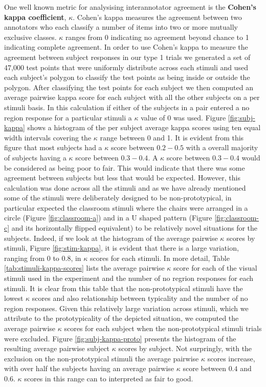\documentclass[11pt,letterpaper]{article}
\begin{document}
One well known metric for analysising interannotator agreement is the \textbf{Cohen's kappa coefficient}, $\kappa$. Cohen's kappa measures the agreement between two annotators who each classify a number of items into two or more mutually exclusive classes. $\kappa$ ranges from 0 indicating no agreement beyond chance to 1 indicating complete agreement. In order to use Cohen's kappa to measure the agreement between subject responses in our type 1 trials we generated a set of 47,000 test points that were uniformly distribute across each stimuli and used each subject's polygon to classify the test points as being inside or outside the polygon. After classifying the test points for each subject we then computed an average pairwise kappa score for each subject with all the other subjects on a per stimuli basis. In this calculation if either of the subjects in a pair entered a no region response for a particular stimuli a $\kappa$ value of 0 was used. Figure \ref{fig:subj-kappa} shows a histogram of the per subject average kappa scores using ten equal width intervals covering the $\kappa$ range between 0 and 1.  It is evident from this figure that most subjects had a $\kappa$ score between $0.2-0.5$ with a overall majority of subjects having a $\kappa$ score between $0.3-0.4$. A $\kappa$ score between $0.3-0.4$ would be considered as being poor to fair. This would indicate that there was some agreement between subjects but less that would be expected. However, this calculation was done across all the stimuli and as we have already mentioned some of the stimuli were deliberately designed to be non-prototypical, in particular expected the classroom stimuli where the chairs were arranged in a circle (Figure \ref{fig:classroom-a}) and in a U shaped pattern (Figure \ref{fig:classroom-c} and its horizontally flipped equivalent) to be relatively novel situations for the subjects. Indeed, if we look at the histogram of the average pairwise $\kappa$ scores by stimuli, Figure \ref{fig:stim-kappa}, it is evident that there is a large variation, ranging from $0$ to $0.8$, in $\kappa$ scores for each stimuli. In more detail, Table \ref{tab:stimuli-kappa-scores} lists the average pairwise $\kappa$ score for each of the visual stimuli used in the experiment and the number of no regrion responses for each stimuli. It is clear from this table that the non-prototypical stimuli have the lowest $\kappa$ scores and also relationship between typicality and the number of no region responses. Given this relatively large variation across stimuli, which we attribute to the prototypicality of the depicted situation, we computed the average pairwise $\kappa$ scores for each subject when the non-prototypical stimuli trials were excluded. Figure \ref{fig:subj-kappa-proto} presents the histogram of the resulting average pairwise subject  $\kappa$ scores by subject. Not surpringly, with the exclusion on the non-prototypical stimuli the average pairwise $\kappa$ scores increase, with over half the subjects having an average pairwise $\kappa$ score between $0.4$ and $0.6$. $\kappa$ scores in this range can to interpreted as fair to good.
\end{document}

